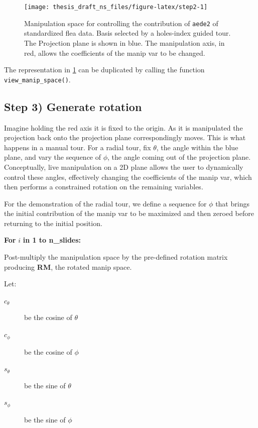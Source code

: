 \documentclass{monashthesis}
\begin{document}
\begin{figure}

{\centering \texttt{[image: thesis\_draft\_ns\_files/figure-latex/step2-1]} 

}

\caption{Manipulation space for controlling the contribution of \texttt{aede2} of standardized flea data. Basis selected by a holes-index guided tour. The Projection plane is shown in blue. The manipulation axis, in red, allows the coefficients of the manip var to be changed.}\label{fig:step2}
\end{figure}

The representation in \ref{fig:step2} can be duplicated by calling the function \texttt{view\_manip\_space()}.

\hypertarget{step-3-generate-rotation-1}{%
\subsection{Step 3) Generate rotation}\label{step-3-generate-rotation-1}}

Imagine holding the red axis it is fixed to the origin. As it is manipulated the projection back onto the projection plane correspondingly moves. This is what happens in a manual tour. For a radial tour, fix \(\theta\), the angle within the blue plane, and vary the sequence of \(\phi\), the angle coming out of the projection plane. Conceptually, live manipulation on a 2D plane allows the user to dynamically control these angles, effectively changing the coefficients of the manip var, which then performs a constrained rotation on the remaining variables.

For the demonstration of the radial tour, we define a sequence for \(\phi\) that brings the initial contribution of the manip var to be maximized and then zeroed before returning to the initial position.

\textbf{For } \(i\) \textbf{in 1 to n\_slides:}

Post-multiply the manipulation space by the pre-defined rotation matrix producing \textbf{RM}, the rotated manip space.

Let:

\begin{description}
  \item[$c_\theta$] be the cosine of $\theta$
  \item[$c_\phi$]   be the cosine of $\phi$
  \item[$s_\theta$] be the sine of   $\theta$
  \item[$s_\phi$]   be the sine of   $\phi$
\end{description}
\end{document}
